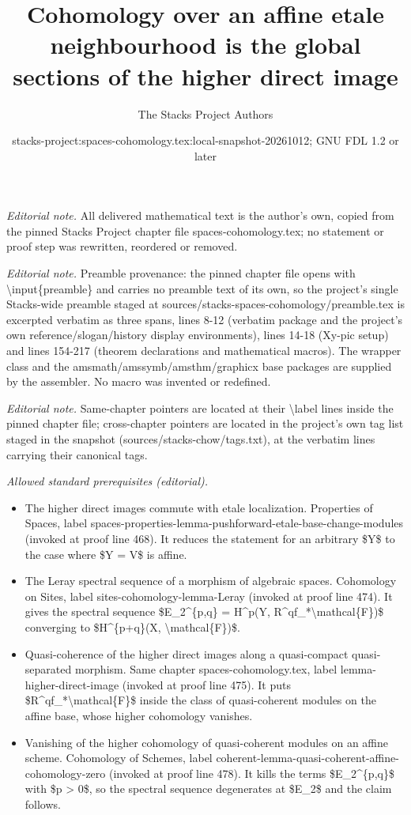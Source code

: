 \documentclass[10pt,a4paper]{amsart}
\title{Cohomology over an affine etale neighbourhood is the global sections of the higher direct image}
\author{The Stacks Project Authors}
\date{stacks-project:spaces-cohomology.tex:local-snapshot-20261012; GNU FDL 1.2 or later}
\theoremstyle{plain}
\theoremstyle{definition}
\theoremstyle{remark}
\numberwithin{equation}{subsection}
\begin{document}
\maketitle
\noindent\textit{Editorial note.} All delivered mathematical text is the author's own, copied from the pinned Stacks Project chapter file spaces-cohomology.tex; no statement or proof step was rewritten, reordered or removed.\par\medskip
\noindent\textit{Editorial note.} Preamble provenance: the pinned chapter file opens with \textbackslash{}input\{preamble\} and carries no preamble text of its own, so the project's single Stacks-wide preamble staged at sources/stacks-spaces-cohomology/preamble.tex is excerpted verbatim as three spans, lines 8-12 (verbatim package and the project's own reference/slogan/history display environments), lines 14-18 (Xy-pic setup) and lines 154-217 (theorem declarations and mathematical macros). The wrapper class and the amsmath/amssymb/amsthm/graphicx base packages are supplied by the assembler. No macro was invented or redefined.\par\medskip
\noindent\textit{Editorial note.} Same-chapter pointers are located at their \textbackslash{}label lines inside the pinned chapter file; cross-chapter pointers are located in the project's own tag list staged in the snapshot (sources/stacks-chow/tags.txt), at the verbatim lines carrying their canonical tags.\par\medskip
\noindent\textit{Allowed standard prerequisites (editorial).}\begin{itemize}
\item The higher direct images commute with etale localization. Properties of Spaces, label spaces-properties-lemma-pushforward-etale-base-change-modules (invoked at proof line 468). It reduces the statement for an arbitrary \$Y\$ to the case where \$Y = V\$ is affine.
\item The Leray spectral sequence of a morphism of algebraic spaces. Cohomology on Sites, label sites-cohomology-lemma-Leray (invoked at proof line 474). It gives the spectral sequence \$E\_2\textasciicircum{}\{p,q\} = H\textasciicircum{}p(Y, R\textasciicircum{}qf\_*\textbackslash{}mathcal\{F\})\$ converging to \$H\textasciicircum{}\{p+q\}(X, \textbackslash{}mathcal\{F\})\$.
\item Quasi-coherence of the higher direct images along a quasi-compact quasi-separated morphism. Same chapter spaces-cohomology.tex, label lemma-higher-direct-image (invoked at proof line 475). It puts \$R\textasciicircum{}qf\_*\textbackslash{}mathcal\{F\}\$ inside the class of quasi-coherent modules on the affine base, whose higher cohomology vanishes.
\item Vanishing of the higher cohomology of quasi-coherent modules on an affine scheme. Cohomology of Schemes, label coherent-lemma-quasi-coherent-affine-cohomology-zero (invoked at proof line 478). It kills the terms \$E\_2\textasciicircum{}\{p,q\}\$ with \$p > 0\$, so the spectral sequence degenerates at \$E\_2\$ and the claim follows.
\end{itemize}\medskip
\end{document}
